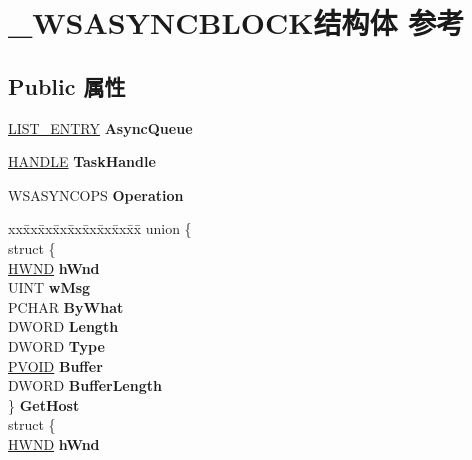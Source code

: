 \hypertarget{struct___w_s_a_s_y_n_c_b_l_o_c_k}{}\section{\+\_\+\+W\+S\+A\+S\+Y\+N\+C\+B\+L\+O\+C\+K结构体 参考}
\label{struct___w_s_a_s_y_n_c_b_l_o_c_k}
\subsection*{Public 属性}
\begin{DoxyCompactItemize}
\item 
\mbox{\label{struct___w_s_a_s_y_n_c_b_l_o_c_k_a201022ea45a98743caf29483e5f94e67}} 
\hyperlink{struct___l_i_s_t___e_n_t_r_y}{L\+I\+S\+T\+\_\+\+E\+N\+T\+RY} {\bfseries Async\+Queue}
\item 
\mbox{\label{struct___w_s_a_s_y_n_c_b_l_o_c_k_a990f9ff87719d03b6c1f4519c0d616e2}} 
\hyperlink{interfacevoid}{H\+A\+N\+D\+LE} {\bfseries Task\+Handle}
\item 
\mbox{\label{struct___w_s_a_s_y_n_c_b_l_o_c_k_a6a6b04d2cdc5c12b02fc35ea0f9981e4}} 
W\+S\+A\+S\+Y\+N\+C\+O\+PS {\bfseries Operation}
\item 
\mbox{\label{struct___w_s_a_s_y_n_c_b_l_o_c_k_a5892b9d044f45321307c400a94dc942a}} 
\begin{tabbing}
xx\=xx\=xx\=xx\=xx\=xx\=xx\=xx\=xx\=\kill
union \{\\
\>struct \{\\
\>\>\hyperlink{interfacevoid}{HWND} {\bfseries hWnd}\\
\>\>UINT {\bfseries wMsg}\\
\>\>PCHAR {\bfseries ByWhat}\\
\>\>DWORD {\bfseries Length}\\
\>\>DWORD {\bfseries Type}\\
\>\>\hyperlink{interfacevoid}{PVOID} {\bfseries Buffer}\\
\>\>DWORD {\bfseries BufferLength}\\
\>\} {\bfseries GetHost}\\
\>struct \{\\
\>\>\hyperlink{interfacevoid}{HWND} {\bfseries hWnd}\\

\end{tabbing}
\end{DoxyCompactItemize}
